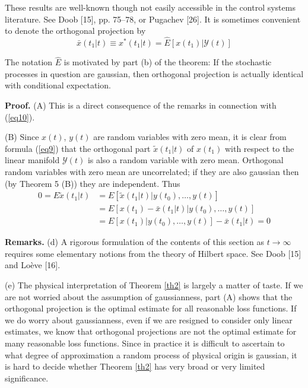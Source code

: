 \documentclass{article}
\newcommand{\manf}[1]{\mathbf{\mathcal{#1}}}
\begin{document}
These results are well-known though not easily accessible in the control systems literature. See Doob [15], pp. 75–78, or Pugachev [26]. It is sometimes convenient to denote the orthogonal projection by
\begin{equation*}
\bar{x}(t_1 \vert t) \equiv x^\ast (t_1 \vert t)=\hat{E}[x(t_1) \vert \mathbf{\mathcal{Y}}(t)]
\end{equation*}

The notation $\hat{E}$ is motivated by part (b) of the theorem: If the stochastic processes in question are gaussian, then orthogonal projection is actually identical with conditional expectation. 

\textbf{Proof.} (A) This is a direct consequence of the remarks in connection
with (\ref{eq10}).

(B) Since $x(t)$, $y(t)$ are random variables with zero mean, it is clear from formula (\ref{eq9}) that the orthogonal part $\tilde{x}(t_1 \vert t)$ of $x(t_1)$ with respect to the linear manifold $\manf{Y}(t)$ is also a random variable with zero mean. Orthogonal random variables with zero mean are uncorrelated; if they are also gaussian then (by Theorem 5 (B)) they are independent. Thus
\begin{equation*}
\begin{split}
0=E\tilde{x}(t_1 \vert t)&=E[\tilde{x}(t_1 \vert t)\vert y(t_0),\dotsc,y(t)]\\
&=E[x(t_1) - \bar{x}(t_1 \vert t)\vert y(t_0),\dotsc,y(t)]\\
&=E[x(t_1)\vert y(t_0),\dotsc,y(t)]-\bar{x}(t_1 \vert t)=0
\end{split}
\end{equation*}

\textbf{Remarks.} (d) A rigorous formulation of the contents of this section as $t \to \infty$ requires some elementary notions from the theory of Hilbert space. See Doob [15] and Lo\`{e}ve [16].

(e) The physical interpretation of Theorem \ref{th2} is largely a matter of taste. If we are not worried about the assumption of gaussianness,
part (A) shows that the orthogonal projection is the optimal estimate for all reasonable loss functions. If we do worry about gaussianness, even if we are resigned to consider only linear estimates, we know that orthogonal projections are not the optimal estimate for many reasonable loss functions. Since in practice it is difficult to ascertain to what degree of approximation a random process of physical origin is gaussian, it is hard to decide whether Theorem \ref{th2} has very broad or very limited significance.
\end{document}
